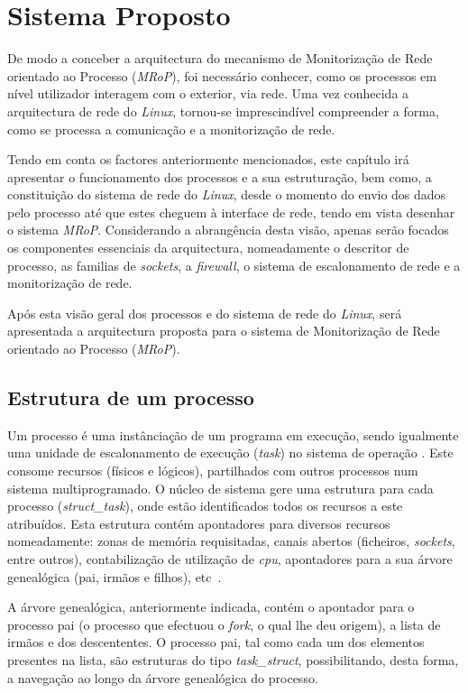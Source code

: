 \chapter{Sistema Proposto}
\label{cap:Estrutura}

De modo a conceber a arquitectura do mecanismo de Monitorização de Rede orientado ao Processo (\textit{MRoP}), foi necessário conhecer, como os processos em nível utilizador interagem com o exterior, via rede.
Uma vez conhecida a arquitectura de rede do \textit{Linux}, tornou-se imprescindível compreender a forma, como se processa a comunicação e a monitorização de rede.

Tendo em conta os factores anteriormente mencionados, este capítulo irá apresentar o funcionamento dos processos e a sua estruturação, bem como, a constituição do sistema de rede do \textit{Linux}, desde o momento do envio dos dados pelo processo até que estes cheguem à interface de rede, tendo em vista desenhar o sistema \textit{MRoP}.
Considerando a abrangência desta visão, apenas serão focados os componentes essenciais da arquitectura, nomeadamente o descritor de processo, as familias de \textit{sockets}, a \textit{firewall}, o sistema de escalonamento de rede e a monitorização de rede.

Após esta visão geral dos processos e do sistema de rede do \textit{Linux}, será apresentada a arquitectura proposta para o sistema de Monitorização de Rede orientado ao Processo (\textit{MRoP}).

\section{Estrutura de um processo}

Um processo é uma instânciação de um programa em execução, sendo igualmente uma unidade de escalonamento de execução (\textit{task}) no sistema de operação .
Este consome recursos (físicos e lógicos), partilhados com outros processos num sistema multiprogramado.
O núcleo de sistema gere uma estrutura para cada processo (\textit{struct\_task}), onde estão identificados todos os recursos a este atribuídos.
Esta estrutura contém apontadores para diversos recursos nomeadamente: zonas de memória requisitadas, canais abertos (ficheiros, \textit{sockets}, entre outros), contabilização de utilização de \textit{cpu}, apontadores para a sua árvore genealógica (pai, irmãos e filhos), etc~\cite{LKI, LKP}.

A árvore genealógica, anteriormente indicada, contém o apontador para o processo pai (o processo que efectuou o \textit{fork}, o qual lhe deu origem), a lista de irmãos e dos descententes.
O processo pai, tal como cada um dos elementos presentes na lista, são estruturas do tipo \textit{task\_struct}, possibilitando, desta forma, a navegação ao longo da árvore genealógica do processo.

